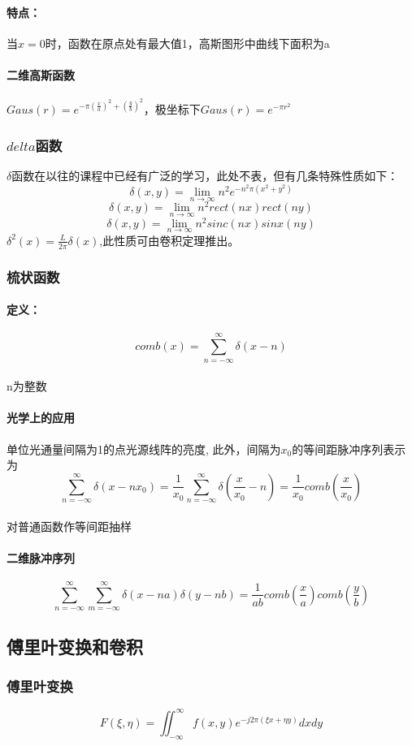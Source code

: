 \documentclass[UTF8]{ctexart}
\newcommand{\f}[2]{\frac{#1}{#2}}%
\newcommand{\sumsum}[3]{\sum_{#1=#2}^#3}
\begin{document}
\paragraph{特点：}当$x=0$时，函数在原点处有最大值1，高斯图形中曲线下面积为a
\paragraph{二维高斯函数}$
Gaus(r)=e^{-\pi(\f{x}{a})^2+(\f{y}{b})^2}
$，极坐标下$Gaus(r)=e^{-\pi r^2}$
\subsubsection{$delta$函数}
$\delta$函数在以往的课程中已经有广泛的学习，此处不表，但有几条特殊性质如下：
\[\delta(x,y)=\lim\limits_{n\to \infty}n^2e^{-n^2\pi(x^2+y^2)}\]
\[\delta(x,y)=\lim\limits_{n\to \infty}n^2rect(nx)rect(ny)\]
\[\delta(x,y)=\lim\limits_{n\to \infty}n^2sinc(nx)sinx(ny)\]
$\delta^2(x)=\f{L}{2\pi}\delta(x)$,此性质可由卷积定理推出。
\subsubsection{梳状函数}
\paragraph{定义：}\[comb(x)=\sum_{n=-\infty}^\infty \delta{(x-n)}\]\\
n为整数
\paragraph{光学上的应用}单位光通量间隔为1的点光源线阵的亮度,
此外，间隔为$x_{0}$的等间距脉冲序列表示为
\[\sumsum{n}{-\infty}{\infty}\delta{(x-nx_{0})}=\f{1}{x_{0}}\sumsum{n}{-\infty}{\infty}\delta{(\f{x}{x_{0}}-n)}=\f{1}{x_{0}}comb(\f{x}{x_{0}})\]
\\对普通函数作等间距抽样
\paragraph{二维脉冲序列}
\[\sumsum{n}{-\infty}{\infty} \sumsum{m}{-\infty}{\infty}\delta{(x-na)}\delta{(y-nb)}=\f{1}{ab}comb(\f{x}{a})comb(\f{y}{b})\]
\subsection{傅里叶变换和卷积}%
\subsubsection{傅里叶变换}
\[F(\xi,\eta)=\iint_{-\infty}^{\infty}f(x,y)e^{-j2\pi(\xi x+\eta y)}dxdy\]
\end{document}
